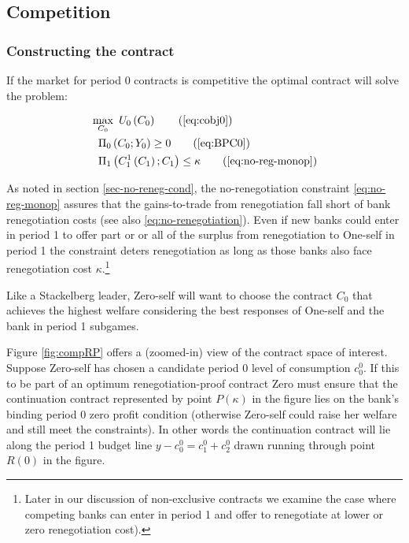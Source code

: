 \documentclass[11pt,english]{article}
\theoremstyle{plain}
\theoremstyle{definition}
\begin{document}
\subsection{Competition}

\subsubsection{Constructing the contract}

If the market for period 0 contracts is competitive the optimal contract
will solve the problem:

\begin{align}
 & \max_{C_{0}}\ U_{0}\left(C_{0}\right)\tag{\ref{eq:cobj0}}\\
 & \ \ \Pi_{0}\left(C_{0};Y_{0}\right)\geq0\tag{\ref{eq:BPC0}}\\
 & \ \ \Pi_{1}\left(C_{1}^{1}\left(C_{1}\right);C_{1}\right)\leq\kappa\tag{\ref{eq:no-reg-monop}}
\end{align}

As noted in section \ref{sec-no-reneg-cond}, the no-renegotiation
constraint \ref{eq:no-reg-monop} assures that the gains-to-trade
from renegotiation fall short of bank renegotiation costs (see also
\ref{eq:no-renegotiation}). Even if new banks could enter in period
1 to offer part or or all of the surplus from renegotiation to One-self
in period 1 the constraint deters renegotiation as long as those banks
also face renegotiation cost $\kappa$.\footnote{Later in our discussion of non-exclusive contracts we examine the
case where competing banks can enter in period 1 and offer to renegotiate
at lower or zero renegotiation cost).}

Like a Stackelberg leader, Zero-self will want to choose the contract
$C_{0}$ that achieves the highest welfare considering the best responses
of One-self and the bank in period 1 subgames.

Figure \ref{fig:compRP} offers a (zoomed-in) view of the
contract space of interest. Suppose Zero-self has chosen a candidate
period 0 level of consumption $c_{0}^{0}$. If this to be part of
an optimum renegotiation-proof contract Zero must ensure that the
continuation contract represented by point $P(\kappa)$ in the figure
lies on the bank's binding period 0 zero profit condition (otherwise
Zero-self could raise her welfare and still meet the constraints).
In other words the continuation contract will lie along the period
1 budget line $y-c_{0}^{0}=c_{1}^{0}+c_{2}^{0}$ drawn running through
point $R(0)$ in the figure.
\end{document}
